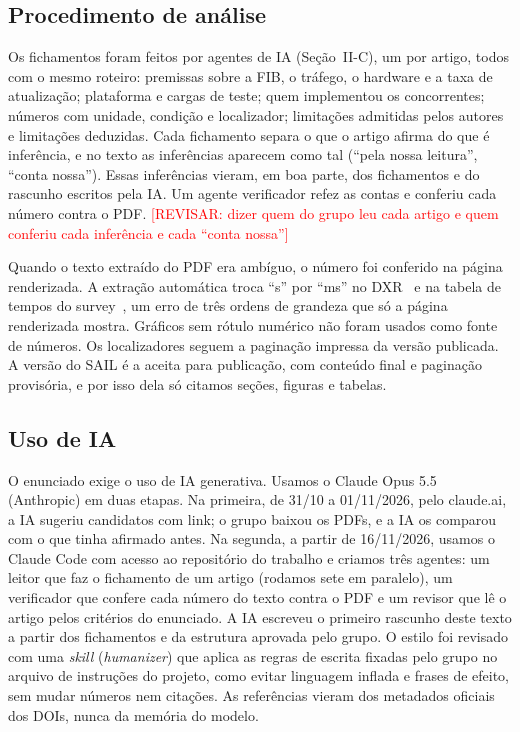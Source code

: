 \documentclass[conference,a4paper]{IEEEtran}
\newcommand{\revisar}[1]{\textcolor{red}{[REVISAR: #1]}}
\begin{document}
\subsection{Procedimento de análise}
Os fichamentos foram feitos por agentes de IA (Seção~II-C), um por artigo, todos com o mesmo roteiro: premissas sobre
a FIB, o tráfego, o hardware e a taxa de atualização; plataforma e cargas de teste; quem implementou os concorrentes;
números com unidade, condição e localizador; limitações admitidas pelos autores e limitações deduzidas. Cada fichamento
separa o que o artigo afirma do que é inferência, e no texto as inferências aparecem como tal (``pela nossa leitura'',
``conta nossa''). Essas inferências vieram, em boa parte, dos fichamentos e do rascunho escritos pela IA. Um agente
verificador refez as contas e conferiu cada número contra o PDF.
\revisar{dizer quem do grupo leu cada artigo e quem conferiu cada inferência e cada ``conta nossa''}

Quando o texto extraído do PDF era ambíguo, o número foi conferido na página renderizada. A extração automática troca
``\textmu s'' por ``ms'' no DXR~\cite[\S4.4]{zec12} e na tabela de tempos do survey~\cite[Tab.~3]{ruiz01}, um erro de
três ordens de grandeza que só a página renderizada mostra. Gráficos sem rótulo numérico não foram usados como fonte de
números. Os localizadores seguem a paginação impressa da versão publicada. A versão do SAIL é a aceita para publicação,
com conteúdo final e paginação provisória, e por isso dela só citamos seções, figuras e tabelas.

\subsection{Uso de IA}
O enunciado exige o uso de IA generativa. Usamos o Claude Opus 5.5 (Anthropic) em duas etapas. Na primeira, de 31/10 a
01/11/2026, pelo claude.ai, a IA sugeriu candidatos com link; o grupo baixou os PDFs, e a IA os comparou com o que tinha
afirmado antes. Na segunda, a partir de 16/11/2026, usamos o Claude Code com acesso ao repositório do trabalho e
criamos três agentes: um leitor que faz o fichamento de um artigo (rodamos sete em paralelo), um verificador que confere
cada número do texto contra o PDF e um revisor que lê o artigo pelos critérios do enunciado. A IA escreveu o primeiro
rascunho deste texto a partir dos fichamentos e da estrutura aprovada pelo grupo. O estilo foi revisado com uma
\textit{skill} (\textit{humanizer}) que aplica as regras de escrita fixadas pelo grupo no arquivo de instruções do
projeto, como evitar linguagem inflada e frases de efeito, sem mudar números nem citações. As referências vieram dos
metadados oficiais dos DOIs, nunca da memória do modelo.
\end{document}
